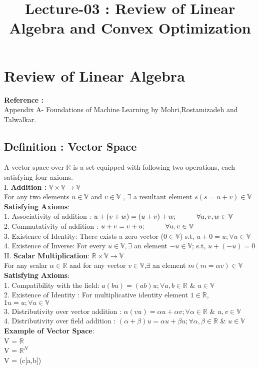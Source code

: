 \documentclass[a4paper,english,12pt]{article}
\title{Lecture-03 : Review of Linear Algebra and Convex Optimization}
\author{}
\newcommand\tab[1][1cm]{\hspace*{#1}}
\begin{document}
\maketitle
\section{Review of Linear Algebra}
\textbf{Reference :}\\
 Appendix A- Foundations of Machine Learning by Mohri,Rostamizadeh and Talwalkar.
\subsection{Definition : Vector Space}
A vector space over $\mathbb{R}$ is a set equipped with following two operations, each satisfying four axioms.\\
I. \textbf{Addition :} $\mathbb{V} \times \mathbb{V} \rightarrow \mathbb{V}$  \\
For any two elements $ u \in \mathbb{V}$ and $v \in \mathbb{V}$ , $\exists$ a resultant element $s (s=u+v) \in \mathbb{V}$\\
\textbf{Satisfying Axioms}:\\
\tab1. Associativity of  addition : $u + (v + w) = (u + v) + w; \tab \forall u,v,w \in \mathbb{V}$\\
\tab2. Commutativity of addition : $u + v = v + u; \tab \forall u,v \in \mathbb{V}$\\
\tab3. Existence of Identity: There exists a zero vector ($0 \in \mathbb{V}$) s.t, $u+0=u; \forall u\in\mathbb{V}$\\
\tab4. Existence of Inverse: For every $u \in \mathbb{V},\exists$ an element $-u\in\mathbb{V}$; s.t, $u+(-u)=0$\\
II. \textbf{Scalar Multiplication}: $\mathbb{R}\times \mathbb{V}\rightarrow \mathbb{V}$\\
For any scalar $\alpha\in\mathbb{R}$ and for any vector $v\in\mathbb{V}$,$\exists$ an element $m (m=\alpha v) \in \mathbb{V}$ \\
\textbf{Satisfying Axioms}:\\ 
\tab1. Compatibility with the field: $a(bu)=(ab)u; \forall a,b \in \mathbb{R}$ \& $u\in\mathbb{V}$\\
\tab2. Existence of Identity : For multiplicative identity element $1 \in \mathbb{R}$, $1u=u; \forall u\in\mathbb{V}$\\
\tab3. Distributivity over vector addition : $\alpha(vu)=\alpha u + \alpha v; \forall \alpha \in \mathbb{R}$ \& $u,v \in\mathbb{V}$ \\
\tab4. Distributivity over field addition : $(\alpha+\beta)u=\alpha u + \beta u; \forall \alpha,\beta \in \mathbb{R}$ \& $u \in\mathbb{V}$ \\
\textbf{Example of Vector Space}:\\
V =  $\mathbb{R}$\\
V =  $\mathbb{R}^N$\\
V =  (c[a,b])\\
\newpage
\end{document}

